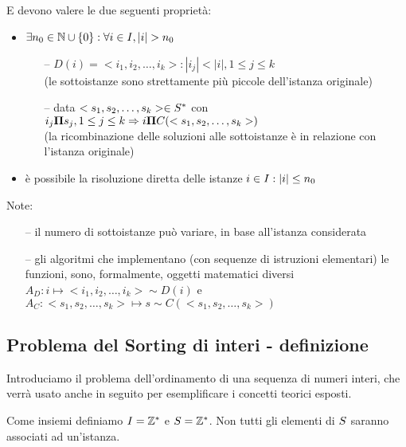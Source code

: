 E devono valere le due seguenti proprietà:
\begin{itemize}
    \item $\exists n_0 \in \mathbb{N} \cup \{0\} : \forall i \in I{}, |i| > n_0 $
        \begin{itemize}
            \item[--] $ D(i)=<i_1, i_2, \dots, i_k>:|i_j|<|i|, 1 \leq j \leq k$ \\
                (le sottoistanze sono strettamente più piccole dell'istanza originale)
            \item[--] data $ <s_1, s_2, \dots, s_k> \in S{}^* $ con $i_j \bm{\Pi}{} s_j,  1 \leq j \leq k \Rightarrow i \bm{\Pi}{} C(<s_1, s_2, \dots, s_k>)$ \\
                (la ricombinazione delle soluzioni alle sottoistanze è in relazione con l'istanza originale)
        \end{itemize}
    \item è possibile la risoluzione diretta delle istanze $ i \in I{} : |i| \leq n_0 $
\end{itemize}

Note:
\begin{itemize}[noitemsep,parsep=0pt,partopsep=0pt]
    \item[--] il numero di sottoistanze può variare, in base all'istanza considerata
    \item[--] gli algoritmi che implementano (con sequenze di istruzioni elementari) le funzioni, sono, formalmente, oggetti matematici diversi \\
        $ A_D : i \mapsto <i_1, i_2, \dots, i_k> \sim D(i)$ e $ A_C : <s_1, s_2, \dots, s_k> \mapsto s \sim C(<s_1, s_2, \dots, s_k>) $
\end{itemize}

\subsection{Problema del Sorting di interi - definizione}

Introduciamo il problema dell'ordinamento di una sequenza di numeri interi, che verrà usato anche in seguito per esemplificare i concetti teorici esposti.

Come insiemi definiamo $I{} = \mathbb{Z}^* $ e $S{} = \mathbb{Z}^* $. Non tutti gli elementi di $S{}$ saranno associati ad un'istanza.

